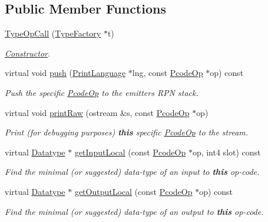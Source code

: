 \subsection*{Public Member Functions}
\begin{DoxyCompactItemize}
\item 
\mbox{\hyperlink{class_type_op_call_af980c0ae582dab4198832ded830424ff}{Type\+Op\+Call}} (\mbox{\hyperlink{class_type_factory}{Type\+Factory}} $\ast$t)
\begin{DoxyCompactList}\small\item\em \mbox{\hyperlink{class_constructor}{Constructor}}. \end{DoxyCompactList}\item 
virtual void \mbox{\hyperlink{class_type_op_call_a8597152ff5c82ac28b9b9811cc5b4417}{push}} (\mbox{\hyperlink{class_print_language}{Print\+Language}} $\ast$lng, const \mbox{\hyperlink{class_pcode_op}{Pcode\+Op}} $\ast$op) const
\begin{DoxyCompactList}\small\item\em Push the specific \mbox{\hyperlink{class_pcode_op}{Pcode\+Op}} to the emitter\textquotesingle{}s R\+PN stack. \end{DoxyCompactList}\item 
virtual void \mbox{\hyperlink{class_type_op_call_ace006a5428b39501951783846770f227}{print\+Raw}} (ostream \&s, const \mbox{\hyperlink{class_pcode_op}{Pcode\+Op}} $\ast$op)
\begin{DoxyCompactList}\small\item\em Print (for debugging purposes) {\bfseries{this}} specific \mbox{\hyperlink{class_pcode_op}{Pcode\+Op}} to the stream. \end{DoxyCompactList}\item 
virtual \mbox{\hyperlink{class_datatype}{Datatype}} $\ast$ \mbox{\hyperlink{class_type_op_call_ac92e69ea35780e349d3ca0cecef0a01e}{get\+Input\+Local}} (const \mbox{\hyperlink{class_pcode_op}{Pcode\+Op}} $\ast$op, int4 slot) const
\begin{DoxyCompactList}\small\item\em Find the minimal (or suggested) data-\/type of an input to {\bfseries{this}} op-\/code. \end{DoxyCompactList}\item 
virtual \mbox{\hyperlink{class_datatype}{Datatype}} $\ast$ \mbox{\hyperlink{class_type_op_call_a0900277daf94a76b57d96ba468514815}{get\+Output\+Local}} (const \mbox{\hyperlink{class_pcode_op}{Pcode\+Op}} $\ast$op) const
\begin{DoxyCompactList}\small\item\em Find the minimal (or suggested) data-\/type of an output to {\bfseries{this}} op-\/code. \end{DoxyCompactList}\end{DoxyCompactItemize}
